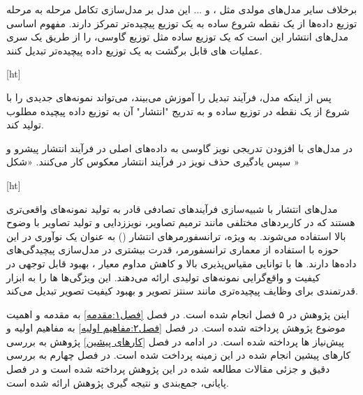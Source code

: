 برخلاف سایر مدل‌های مولدی مثل ،  و ... این مدل‌ بر مدل‌سازی تکامل مرحله به مرحله توزیع داده‌ها از یک نقطه شروع ساده به یک توزیع پیچیده‌تر تمرکز دارند. مفهوم اساسی مدل‌های انتشار این است که یک توزیع ساده مثل توزیع گاوسی، را از طریق یک سری عملیات های قابل برگشت به یک توزیع داده پیچیده‌تر تبدیل کنند.

[ht]

پس از اینکه مدل، فرآیند تبدیل را آموزش می‌بیند، می‌تواند نمونه‌های جدیدی را با شروع از یک نقطه در توزیع ساده و به تدریج "انتشار" آن به توزیع داده پیچیده مطلوب تولید کند.

در مدل‌های 
با افزودن تدریجی نویز گاوسی به داده‌های اصلی در فرآیند انتشار پیشرو و سپس یادگیری حذف نویز در فرآیند انتشار معکوس کار می‌کنند. «شکل »


[ht]




مدل‌های انتشار با شبیه‌سازی فرآیندهای تصادفی قادر به تولید نمونه‌های واقعی‌تری هستند که در کاربردهای مختلفی مانند ترمیم تصاویر، نویززدایی و تولید تصاویر با وضوح بالا استفاده می‌شوند. به ویژه، ترانسفورمرهای انتشار () به عنوان یک نوآوری در این حوزه با استفاده از معماری ترانسفورمر، قدرت بیشتری در مدل‌سازی پیچیدگی‌های داده‌ها دارند. ها با توانایی مقیاس‌پذیری بالا و کاهش مداوم معیار ، بهبود قابل توجهی در کیفیت و واقع‌گرایی نمونه‌های تولیدی ارائه می‌دهند. این ویژگی‌ها ها را به ابزار قدرتمندی برای وظایف پیچیده‌تری مانند سنتز تصویر و بهبود کیفیت تصویر تبدیل می‌کند.


اینن پژوهش در ۵ فصل انجام شده است. در فصل \ref{فصل۱:مقدمه} به مقدمه و اهمیت موضوع پژوهش پرداخته شده است. در فصل \ref{فصل۲:مفاهیم اولیه} به مفاهیم اولیه و پیش‌نیاز ها پرداخته شده است. در ادامه در فصل \ref{کارهای پیشین} پژوهش به بررسی کار‌های پیشین انجام شده در این زمینه پرداخت شده است. در فصل چهارم به بررسی دقیق و جزئی مقالات مطالعه شده در این پژوهش پرداخته شده است و در فصل پایانی، جمع‌بندی و نتیجه گیری پژوهش ارائه شده است.